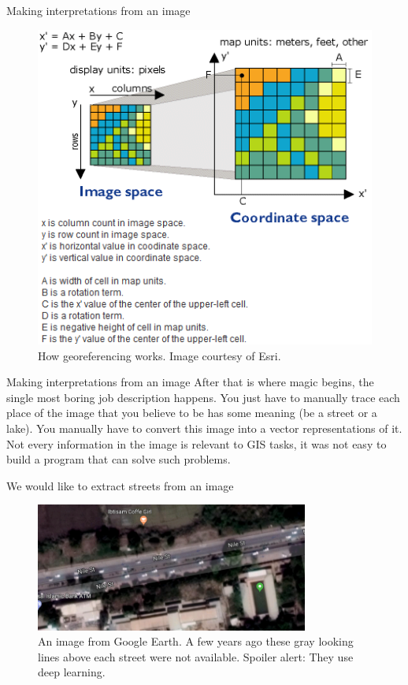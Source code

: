 \documentclass{beamer}
\begin{document}
\begin{frame}{Making interpretations from an image}
  \begin{figure}
  \centering
  
  \includegraphics{images/esri-georef}

  \caption{How georeferencing works. Image courtesy of Esri.}
\end{figure}
\end{frame}

\begin{frame}{Making interpretations from an image}
  After that is where magic begins, the single most boring job description
  happens. You just have to manually trace each place of the image that you
  believe to be has some meaning (be a street or a lake). You manually have to
  convert this image into a vector representations of it. Not every information
  in the image is relevant to GIS tasks, it was not easy to build a program that
  can solve such problems.
\end{frame}

\begin{frame}{We would like to extract streets from an image}
  \begin{figure}
    \centering
    \includegraphics[width=0.8\textwidth]{images/google-maps-street-1}
    \caption{An image from Google Earth. A few years ago these gray looking
      lines above each street were not available. Spoiler alert: They use deep learning.}
  \end{figure}
\end{frame}
\end{document}
